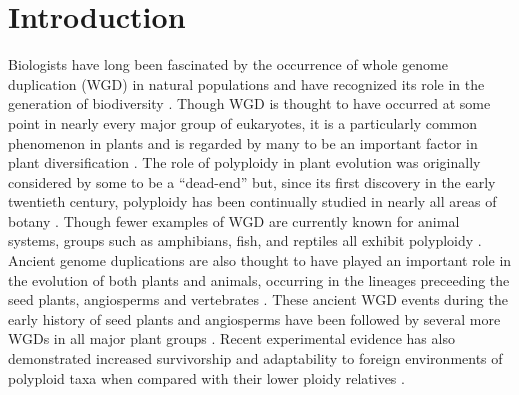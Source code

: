 \documentclass[11pt,english,letterpaper,oneside]{article}
\begin{document}
\section{Introduction}            %

Biologists have long been fascinated by the occurrence of whole genome duplication (WGD) in natural populations and have recognized its role in the generation of biodiversity \citep{ClausKeckHies1940,StebbinsVariationEvolution,GrantPlantSpeciation,otto2000polyploidy}. Though WGD is thought to have occurred at some point in nearly every major group of eukaryotes, it is a particularly common phenomenon in plants and is regarded by many to be an important factor in plant diversification \citep{wood2009polyploid,soltisd2009diversification,scarpino2014polyploid}. The role of polyploidy in plant evolution was originally considered by some to be a ``dead-end'' \citep{StebbinsVariationEvolution,wagner1970noise,soltisd2014stebbins} but, since its first discovery in the early twentieth century, polyploidy has been continually studied in nearly all areas of botany \citep{winge1917polyploidy,Winkler1916polyploidy,ClausKeckHies1945polyploidy,GrantPlantSpeciation,StebbinsVariationEvolution,soltisD2003polyploid,soltisd2010polyploidUnknowns,soltai2009roleOfHybridization,ramsey2014polEcoProcRoySoc}. Though fewer examples of WGD are currently known for animal systems, groups such as amphibians, fish, and reptiles all exhibit polyploidy \citep{allendorf1984tetraploidFish,gregory2005polyploidyAnimals}. Ancient genome duplications are also thought to have played an important role in the evolution of both plants and animals, occurring in the lineages preceeding the seed plants, angiosperms and vertebrates \citep{ohno1970geneDuplication,otto2000polyploidy,furlong2001animalOctoploid,jiao2011ancientWGD}. These ancient WGD events during the early history of seed plants and angiosperms have been followed by several more WGDs in all major plant groups \citep{cui2006genomeDuplication,scarpino2014polyploid,canon2014polyploidyLegumes}. Recent experimental evidence has also demonstrated increased survivorship and adaptability to foreign environments of polyploid taxa when compared with their lower ploidy relatives \citep{ramsey2011polyploidEcology,Selmecki2015yeastAdaptation,OhioSupercomputerCenter1987}.
\medskip
\end{document}
